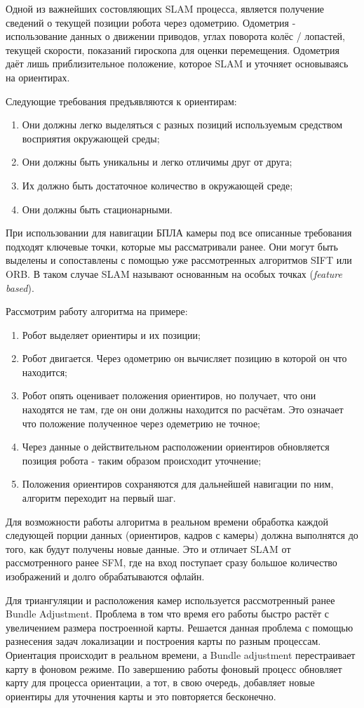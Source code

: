 Одной из важнейших состовляющих SLAM процесса, является получение сведений о текущей позиции робота через одометрию. Одометрия - использование данных о движении приводов, углах поворота колёс / лопастей, текущей скорости, показаний гироскопа для оценки перемещения. Одометрия даёт лишь приблизительное положение, которое SLAM и уточняет основываясь на ориентирах.

Следующие требования предъявляются к ориентирам:
\begin{enumerate}
    \item Они должны легко выделяться с разных позиций используемым средством восприятия окружающей среды;
    \item Они должны быть уникальны и легко отличимы друг от друга;
    \item Их должно быть достаточное количество в окружающей среде;
    \item Они должны быть стационарными.
\end{enumerate}

При использовании для навигации БПЛА камеры под все описанные требования подходят ключевые точки, которые мы рассматривали ранее. Они могут быть выделены и сопоставлены с помощью уже рассмотренных алгоритмов SIFT или ORB. В таком случае SLAM называют основанным на особых точках (\textit{feature based}).

\vspace{1mm}
Рассмотрим работу алгоритма на примере:
\begin{enumerate}
    \item Робот выделяет ориентиры и их позиции;
    \item Робот двигается. Через одометрию он вычисляет позицию в которой он  что находится;
    \item Робот опять оценивает положения ориентиров, но получает, что они находятся не там, где он  они должны находится по расчётам. Это означает что положение полученное через одеметрию не точное;
    \item Через данные о действительном расположении ориентиров обновляется позиция робота - таким образом происходит уточнение;
    \item Положения ориентиров сохраняются для дальнейшей навигации по ним, алгоритм переходит на первый шаг.
\end{enumerate}

Для возможности работы алгоритма в реальном времени обработка каждой следующей порции данных (ориентиров, кадров с камеры) должна выполнятся до того, как будут получены новые данные. Это и отличает SLAM от рассмотренного ранее SFM, где на вход поступает сразу большое количество изображений и долго обрабатываются офлайн.

Для триангуляции и расположения камер используется рассмотренный ранее Bundle Adjustment. Проблема в том что время его работы быстро растёт с увеличением размера построенной карты. Решается данная проблема с помощью разнесения задач локализации и построения карты по разным процессам. Ориентация происходит в реальном времени, а Bundle adjustment перестраивает карту в фоновом режиме. По завершению работы фоновый процесс обновляет карту для процесса ориентации, а тот, в свою очередь, добавляет новые ориентиры для уточнения карты и это повторяется бесконечно.
